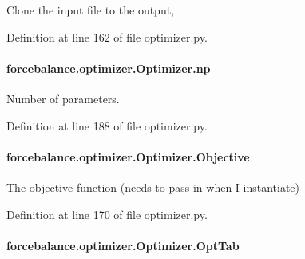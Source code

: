Clone the input file to the output, 

Definition at line 162 of file optimizer.\-py.

\hypertarget{classforcebalance_1_1optimizer_1_1Optimizer_af198da71b849e8e10611bf16ea5914cf}{
\paragraph[{np}]{\setlength{\rightskip}{0pt plus 5cm}forcebalance.\-optimizer.\-Optimizer.\-np}}\label{classforcebalance_1_1optimizer_1_1Optimizer_af198da71b849e8e10611bf16ea5914cf}


Number of parameters. 



Definition at line 188 of file optimizer.\-py.

\hypertarget{classforcebalance_1_1optimizer_1_1Optimizer_a485c636c02ff86bb7709a44582c7693e}{
\paragraph[{Objective}]{\setlength{\rightskip}{0pt plus 5cm}forcebalance.\-optimizer.\-Optimizer.\-Objective}}\label{classforcebalance_1_1optimizer_1_1Optimizer_a485c636c02ff86bb7709a44582c7693e}


The objective function (needs to pass in when I instantiate) 



Definition at line 170 of file optimizer.\-py.

\hypertarget{classforcebalance_1_1optimizer_1_1Optimizer_a30e7e28bf0af3cffc94aa51a58a3d345}{
\paragraph[{Opt\-Tab}]{\setlength{\rightskip}{0pt plus 5cm}forcebalance.\-optimizer.\-Optimizer.\-Opt\-Tab}}\label{classforcebalance_1_1optimizer_1_1Optimizer_a30e7e28bf0af3cffc94aa51a58a3d345}


